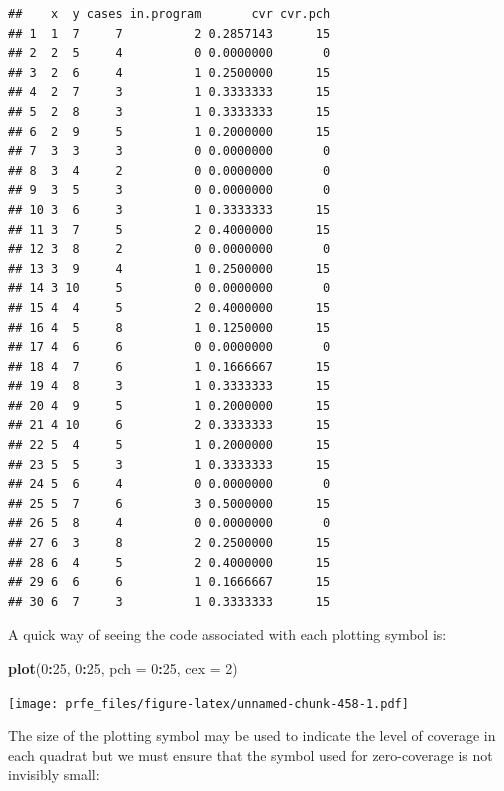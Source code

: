 \documentclass[12pt,a4paper]{book}
\newenvironment{Shaded}{\begin{snugshade}}{\end{snugshade}}
\newcommand{\DataTypeTok}[1]{\textcolor[rgb]{0.13,0.29,0.53}{#1}}
\newcommand{\DecValTok}[1]{\textcolor[rgb]{0.00,0.00,0.81}{#1}}
\newcommand{\KeywordTok}[1]{\textcolor[rgb]{0.13,0.29,0.53}{\textbf{#1}}}
\newcommand{\NormalTok}[1]{#1}
\newcommand{\OperatorTok}[1]{\textcolor[rgb]{0.81,0.36,0.00}{\textbf{#1}}}
\newcommand{\StringTok}[1]{\textcolor[rgb]{0.31,0.60,0.02}{#1}}
\theoremstyle{definition}
\theoremstyle{definition}
\theoremstyle{definition}
\theoremstyle{remark}
\begin{document}
\begin{verbatim}
##    x  y cases in.program       cvr cvr.pch
## 1  1  7     7          2 0.2857143      15
## 2  2  5     4          0 0.0000000       0
## 3  2  6     4          1 0.2500000      15
## 4  2  7     3          1 0.3333333      15
## 5  2  8     3          1 0.3333333      15
## 6  2  9     5          1 0.2000000      15
## 7  3  3     3          0 0.0000000       0
## 8  3  4     2          0 0.0000000       0
## 9  3  5     3          0 0.0000000       0
## 10 3  6     3          1 0.3333333      15
## 11 3  7     5          2 0.4000000      15
## 12 3  8     2          0 0.0000000       0
## 13 3  9     4          1 0.2500000      15
## 14 3 10     5          0 0.0000000       0
## 15 4  4     5          2 0.4000000      15
## 16 4  5     8          1 0.1250000      15
## 17 4  6     6          0 0.0000000       0
## 18 4  7     6          1 0.1666667      15
## 19 4  8     3          1 0.3333333      15
## 20 4  9     5          1 0.2000000      15
## 21 4 10     6          2 0.3333333      15
## 22 5  4     5          1 0.2000000      15
## 23 5  5     3          1 0.3333333      15
## 24 5  6     4          0 0.0000000       0
## 25 5  7     6          3 0.5000000      15
## 26 5  8     4          0 0.0000000       0
## 27 6  3     8          2 0.2500000      15
## 28 6  4     5          2 0.4000000      15
## 29 6  6     6          1 0.1666667      15
## 30 6  7     3          1 0.3333333      15
\end{verbatim}

A quick way of seeing the code associated with each plotting symbol is:

\begin{Shaded}
\begin{Highlighting}[]
\KeywordTok{plot}\NormalTok{(}\DecValTok{0}\OperatorTok{:}\DecValTok{25}\NormalTok{, }\DecValTok{0}\OperatorTok{:}\DecValTok{25}\NormalTok{, }\DataTypeTok{pch =} \DecValTok{0}\OperatorTok{:}\DecValTok{25}\NormalTok{, }\DataTypeTok{cex =} \DecValTok{2}\NormalTok{)}
\end{Highlighting}
\end{Shaded}

\texttt{[image: prfe\_files/figure-latex/unnamed-chunk-458-1.pdf]}

The size of the plotting symbol may be used to indicate the level of
coverage in each quadrat but we must ensure that the symbol used for
zero-coverage is not invisibly small:

\begin{Shaded}
\end{Shaded}
\end{document}
